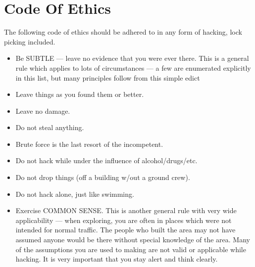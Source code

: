 \section*{Code Of Ethics}
The following code of ethics should be adhered to in any form of hacking, lock picking included.
\begin{itemize}
    \item Be SUBTLE — leave no evidence that you were ever there. This is a general rule which applies to lots of circumstances — a few are enumerated explicitly in this list, but many principles follow from this simple edict
    \item Leave things as you found them or better.
    \item Leave no damage.
    \item Do not steal anything.
    \item Brute force is the last resort of the incompetent.
    \item Do not hack while under the influence of alcohol/drugs/etc.
    \item Do not drop things (off a building w/out a ground crew).
    \item Do not hack alone, just like swimming.
    \item Exercise COMMON SENSE. This is another general rule with very wide applicability — when exploring, you are often in places which were not intended for normal traffic. The people who built the area may not have assumed anyone would be there without special knowledge of the area. Many of the assumptions you are used to making are not valid or applicable while hacking. It is very important that you stay alert and think clearly.
\end{itemize}

